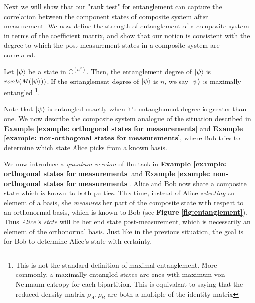 Next we will show that our "rank test" for entanglement can capture the correlation between the component states of composite system after measurement.  We now define the strength of entanglement of a composite system in terms of the coefficient matrix, and show that our notion is consistent with the degree to which the post-measurement states in a composite system are correlated.

\begin{definition} \label{def: maximally entangled}
 Let $\ket{\psi}$ be a state in ${\mathbb{C}}^{(n^2)}$.  Then, the entanglement degree of $\ket{\psi}$ is $rank(M(\ket{\psi}))$.  If the entanglement degree of $\ket{\psi}$ is $n$, we say $\ket{\psi}$ is maximally entangled \footnote{This is not the standard definition of maximal entanglement.  More commonly, a maximally entangled states are ones with maximum von Neumann entropy for each bipartition. This is equivalent to saying that the reduced density matrix $\rho_A, \rho_B$ are both a multiple of the identity matrix}.
\end{definition}


Note that $\ket{\psi}$ is entangled exactly when it's entanglement degree is greater than one.  We now describe the composite system analogue of the situation described in \textbf{Example \ref{example: orthogonal states for measurements}} and \textbf{Example \ref{example: non-orthogonal states for measurements}}, where Bob tries to determine which state Alice picks from a known basis. 

We now introduce a {\emph{quantum version}} of the task in \textbf{Example \ref{example: orthogonal states for measurements}} and \textbf{Example \ref{example: non-orthogonal states for measurements}}. Alice and Bob now share a composite state which is known to both parties.  This time, instead of Alice {\emph{selecting}} an element of a basis, she {\emph{measures}} her part of the composite state with respect to an orthonormal basis, which is known to Bob (see \textbf{Figure \ref{fig:entanglement}}).  Thus {\emph{Alice's state}} will be her end state post-measurement, which is necessarily an element of the orthonormal basis.  Just like in the previous situation, the goal is for Bob to determine Alice's state with certainty.  



